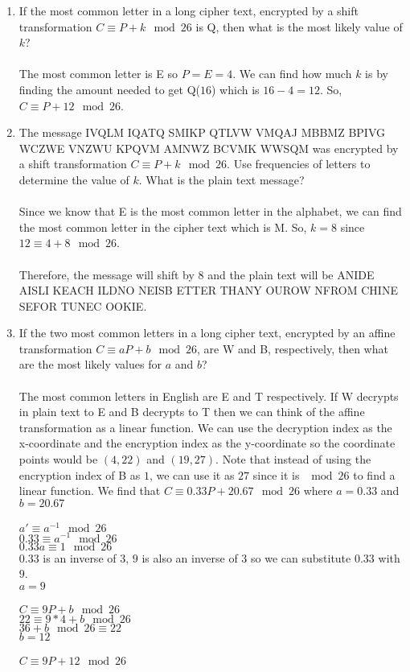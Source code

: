 \documentclass[]{article}
\begin{document}
\begin{enumerate}
    \item If the most common letter in a long cipher text, encrypted by a shift transformation $C \equiv P + k \mod 26$ is Q, then what is the most likely value of $k$?
    \\\\The most common letter is E so $P=E=4$. We can find how much $k$ is by finding the amount needed to get Q($16$) which is $16-4=12$. So, $C \equiv P +12 \mod 26$.

    \item The message IVQLM IQATQ SMIKP QTLVW VMQAJ MBBMZ BPIVG WCZWE VNZWU KPQVM AMNWZ BCVMK WWSQM was encrypted by a shift transformation $C \equiv P + k \mod 26$. Use  frequencies of letters to determine the value of $k$. What is the plain text message?
    \\\\Since we know that E is the most common letter in the alphabet, we can find the most common letter in the cipher text which is M. So, $k=8$ since $12 \equiv 4 + 8 \mod 26$.
    \\\\Therefore, the message will shift by $8$ and the plain text will be ANIDE AISLI KEACH ILDNO NEISB ETTER THANY OUROW NFROM CHINE SEFOR TUNEC OOKIE.

    \item If the two most common letters in a long cipher text, encrypted by an affine transformation $C \equiv aP + b \mod 26$, are W and B, respectively, then what are the most likely values for $a$ and $b$?
    \\\\The most common letters in English are E and T respectively. If W decrypts in plain text to E and B decrypts to T then we can think of the affine transformation as a linear function. We can use the decryption index as the x-coordinate and the encryption index as the y-coordinate so the coordinate points would be $(4, 22)$ and $(19,27)$. Note that instead of using the encryption index of B as $1$, we can use it as $27$ since it is $\mod 26$ to find a linear function. We find that $C \equiv 0.33P + 20.67 \mod 26$ where $a=0.33$ and $b=20.67$
    \\\\$a' \equiv a^{-1} \mod 26$
    \\$0.33 \equiv a^{-1} \mod 26$
    \\$0.33a\equiv 1 \mod 26$
    \\$0.33$ is an inverse of $3$, $9$ is also an inverse of $3$ so we can substitute $0.33$ with $9$.
    \\$a=9$
    \\\\$C \equiv 9P + b \mod 26$
    \\$22 \equiv 9*4 + b \mod 26$
    \\$36 + b \mod 26 \equiv 22$
    \\$b=12$
    \\\\$C \equiv 9P + 12 \mod 26$


\end{enumerate}
\end{document}
